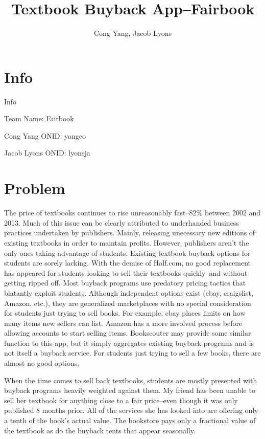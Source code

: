 \documentclass[12pt]{article}
\title{Textbook Buyback App--Fairbook}
\author{Cong Yang, Jacob Lyons}
\begin{document}
	\maketitle

	\tableofcontents
                \section{Info}
		Info \par
		Team Name: Fairbook \par
		Cong Yang ONID: yangco \par
		Jacob Lyons ONID: lyonsja \par


	\section{Problem}
	The price of textbooks continues to rise unreasonably fast--82\% between 2002 and 2013.
	\cite{cnbc}
	Much of this issue can be clearly attributed to underhanded business practices undertaken
	by publishers. Mainly, releasing unecessary new editions of existing textbooks in order to maintain
	profits. 
	However, publishers aren't the only ones taking advantage of students. 
	Existing textbook buyback options for students are sorely lacking. With the demise of Half.com, 
	no good replacement has appeared for students looking to sell their textbooks quickly--and without 
	getting ripped off.	
        Most buyback programs use predatory pricing tactics that blatantly exploit students. Although independent options 
	exist (ebay, craigslist, Amazon, etc.), they are
	generalized marketplaces with no special consideration for students just trying to sell books. For example,
	ebay places limits on how many items new sellers can list. 
	Amazon has a more involved process before allowing accounts to start selling items.
	Bookscouter may provide some similar function to this app, but it simply aggregates existing buyback programs and is not itself
	a buyback service.
 	For students just trying to sell a few books,
	there are almost no good options.\par
	
	When the time comes to sell back textbooks, students are mostly presented with buyback programs heavily weighted
	against them. My friend has been unable to sell her textbook for anything close to a fair price--even though it was only published 8 months prior.
	All of the services she has looked into are offering only a tenth of the book's actual value. The bookstore pays only
	a fractional value of the textbook as do the buyback tents that appear seasonally. \par
		
\end{document}
